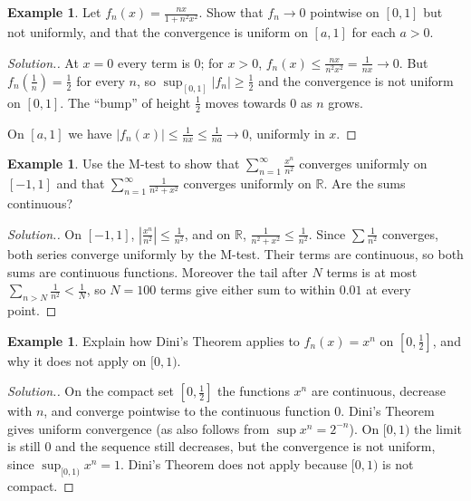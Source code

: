 \documentclass[11pt,a4paper]{article}
\numberwithin{equation}{section}
\theoremstyle{definition}
\newtheorem{exa}[thm]{Example}
\newenvironment{solution}
  {\renewcommand{\qedsymbol}{}\begin{proof}[\textit{Solution}.]}
  {\end{proof}}
\begin{document}
\begin{exa}
Let $f_n(x) = \frac{nx}{1+n^2x^2}$. Show that $f_n\longrightarrow0$ pointwise on $[0,1]$ but not uniformly, and that the convergence is uniform on $[a,1]$ for each $a>0$.
\end{exa}

\begin{solution}
At $x = 0$ every term is $0$; for $x>0$, $f_n(x)\leq\frac{nx}{n^2x^2} = \frac{1}{nx}\longrightarrow0$. But $f_n\left(\frac{1}{n}\right) = \frac{1}{2}$ for every $n$, so $\sup_{[0,1]}|f_n|\geq\frac{1}{2}$ and the convergence is not uniform on $[0,1]$. The ``bump'' of height $\frac{1}{2}$ moves towards $0$ as $n$ grows.

On $[a,1]$ we have $|f_n(x)|\leq\frac{1}{nx}\leq\frac{1}{na}\longrightarrow0$, uniformly in $x$.
\end{solution}

\begin{exa}
Use the M-test to show that $\displaystyle\sum_{n=1}^\infty\frac{x^n}{n^2}$ converges uniformly on $[-1,1]$ and that $\displaystyle\sum_{n=1}^\infty\frac{1}{n^2+x^2}$ converges uniformly on $\mathbb{R}$. Are the sums continuous?
\end{exa}

\begin{solution}
On $[-1,1]$, $\left|\frac{x^n}{n^2}\right|\leq\frac{1}{n^2}$, and on $\mathbb{R}$, $\frac{1}{n^2+x^2}\leq\frac{1}{n^2}$. Since $\sum\frac{1}{n^2}$ converges, both series converge uniformly by the M-test. Their terms are continuous, so both sums are continuous functions. Moreover the tail after $N$ terms is at most $\sum_{n>N}\frac{1}{n^2}<\frac{1}{N}$, so $N = 100$ terms give either sum to within $0.01$ at every point.
\end{solution}

\begin{exa}
Explain how Dini's Theorem applies to $f_n(x) = x^n$ on $\left[0,\frac{1}{2}\right]$, and why it does not apply on $[0,1)$.
\end{exa}

\begin{solution}
On the compact set $\left[0,\frac{1}{2}\right]$ the functions $x^n$ are continuous, decrease with $n$, and converge pointwise to the continuous function $0$. Dini's Theorem gives uniform convergence (as also follows from $\sup x^n = 2^{-n}$). On $[0,1)$ the limit is still $0$ and the sequence still decreases, but the convergence is not uniform, since $\sup_{[0,1)}x^n = 1$. Dini's Theorem does not apply because $[0,1)$ is not compact.
\end{solution}
\end{document}
